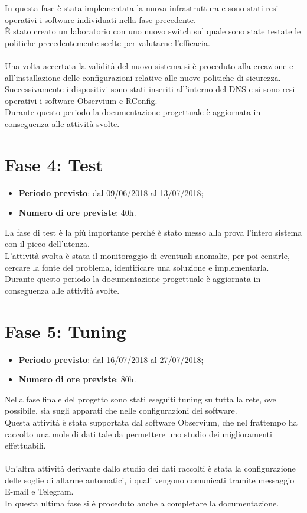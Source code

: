 \documentclass[Tesi.tex]{subfiles}
\begin{document}
In questa fase è stata implementata la nuova infrastruttura e sono stati resi operativi i software individuati nella fase precedente. \\
\`{E} stato creato un laboratorio con uno nuovo switch sul quale sono state testate le politiche precedentemente scelte per valutarne l'efficacia.\\\\
Una volta accertata la validità del nuovo sistema si è proceduto alla creazione e all'installazione delle configurazioni relative alle nuove politiche di sicurezza. \\
Successivamente i dispositivi sono stati inseriti all'interno del DNS e si sono resi operativi i software Observium e RConfig. \\
Durante questo periodo la documentazione progettuale è aggiornata in conseguenza alle attività svolte.


\section{Fase 4: Test}
\begin{itemize}
	\item \textbf{Periodo previsto}: dal 09/06/2018 al 13/07/2018;
	\item \textbf{Numero di ore previste}: 40h.
\end{itemize}
	
La fase di test è la più importante perché è stato messo alla prova l'intero sistema con il picco dell'utenza. \\
L'attività svolta è stata il monitoraggio di eventuali anomalie, per poi censirle, cercare la fonte del problema, identificare una soluzione e implementarla. \\
Durante questo periodo la documentazione progettuale è aggiornata in conseguenza alle attività svolte.

	

\section{Fase 5: Tuning}
\begin{itemize}
	\item \textbf{Periodo previsto}: dal 16/07/2018 al 27/07/2018;
	\item \textbf{Numero di ore previste}: 80h.
\end{itemize}
	
Nella fase finale del progetto sono stati eseguiti tuning su tutta la rete, ove possibile, sia sugli apparati che nelle configurazioni dei software. \\
Questa attività è stata supportata dal software Observium, che nel frattempo ha raccolto una mole di dati tale da permettere uno studio dei miglioramenti effettuabili.\\\\
Un'altra attività derivante dallo studio dei dati raccolti è stata la configurazione delle soglie di allarme automatici, i quali vengono comunicati tramite messaggio E-mail e Telegram. \\
In questa ultima fase si è proceduto anche a completare la documentazione. 
\end{document}
